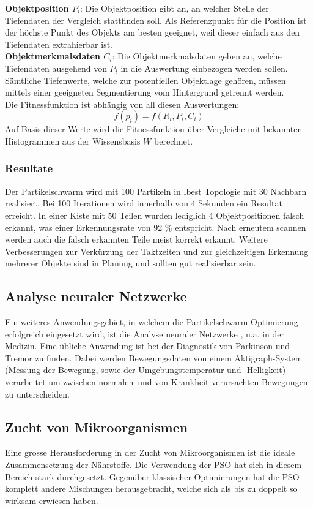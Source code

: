 \textbf{Objektposition $P_i$}: Die Objektposition gibt an, an welcher Stelle der Tiefendaten der Vergleich stattfinden soll. Als Referenzpunkt für die Position ist der höchste Punkt des Objekts am besten geeignet, weil dieser einfach aus den Tiefendaten extrahierbar ist. \\

\textbf{Objektmerkmalsdaten $C_i$}: Die Objektmerkmalsdaten geben an, welche Tiefendaten ausgehend von $P_i$ in die Auswertung einbezogen werden sollen. Sämtliche Tiefenwerte, welche zur potentiellen Objektlage gehören, müssen mittels einer geeigneten Segmentierung vom Hintergrund getrennt werden. \\


Die Fitnessfunktion ist abhängig von all diesen Auswertungen:
\begin{equation}
	f(p_i) = f(R_i,P_i,C_i)
\end{equation}
Auf Basis dieser Werte wird die Fitnessfunktion über Vergleiche mit bekannten Histogrammen aus der Wissensbasis $W$ berechnet.

\subsubsection{Resultate}
Der Partikelschwarm wird mit 100 Partikeln in lbest Topologie mit 30 Nachbarn realisiert. Bei 100 Iterationen wird innerhalb von 4 Sekunden ein Resultat erreicht. In einer Kiste mit 50 Teilen wurden lediglich 4 Objektpositionen falsch erkannt, was einer Erkennungsrate von 92 \% entspricht. Nach erneutem scannen werden auch die falsch erkannten Teile meist korrekt erkannt. Weitere Verbesserungen zur Verkürzung der Taktzeiten und zur gleichzeitigen Erkennung  mehrerer Objekte sind in Planung und sollten gut realisierbar sein.

\subsection{Analyse neuraler Netzwerke}
Ein weiteres Anwendungsgebiet, in welchem die Partikelschwarm Optimierung erfolgreich eingesetzt wird, ist die Analyse neuraler Netzwerke , u.a. in der Medizin. Eine übliche Anwendung ist bei der Diagnostik von Parkinson und Tremor zu finden. Dabei werden Bewegungsdaten von einem Aktigraph-System (Messung der Bewegung, sowie der Umgebungstemperatur und -Helligkeit) verarbeitet um zwischen \textacutedbl normalen\textacutedbl \ und von Krankheit verursachten Bewegungen zu unterscheiden. \cite{Shi-Appl}

\subsection{Zucht von Mikroorganismen}
Eine grosse Herausforderung in der Zucht von Mikroorganismen ist die ideale Zusammensetzung der Nährstoffe. Die Verwendung der PSO hat sich in diesem Bereich stark durchgesetzt. Gegenüber klassischer Optimierungen hat die PSO komplett andere Mischungen herausgebracht, welche sich als bis zu doppelt so wirksam erwiesen haben. \cite{Shi-Appl}